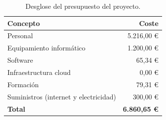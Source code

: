 \begin{table}[H]
\centering
\begin{tabular}{lr}
\hline
\textbf{Concepto} & \textbf{Coste} \\
\hline
Personal & 5.216,00 € \\
Equipamiento informático & 1.200,00 € \\
Software & 65,34 € \\
Infraestructura cloud & 0,00 € \\
Formación & 79,31 € \\
Suministros (internet y electricidad) & 300,00 € \\
\hline
\textbf{Total} & \textbf{6.860,65 €} \\
\hline
\end{tabular}
\caption{Desglose del presupuesto del proyecto.}
\label{tab:presupuesto}
\end{table}
